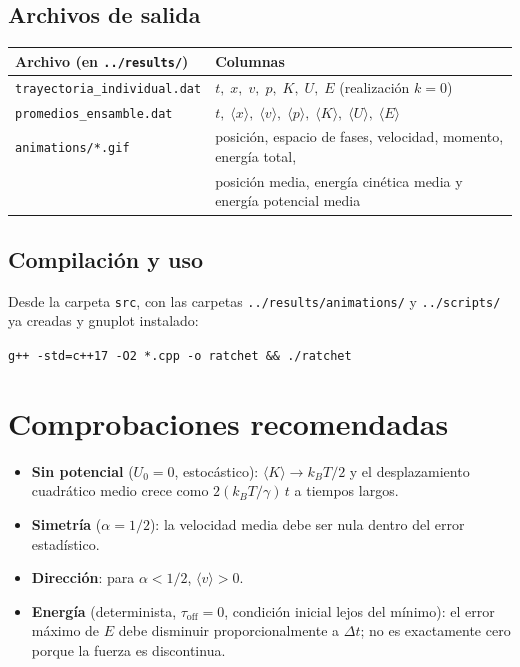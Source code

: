 \documentclass[11pt,a4paper]{article}
\begin{document}
\subsection{Archivos de salida}
\begin{center}
\begin{tabular}{@{}ll@{}}
\toprule
Archivo (en \texttt{../results/}) & Columnas \\
\midrule
\texttt{trayectoria\_individual.dat} & $t,\;x,\;v,\;p,\;K,\;U,\;E$ (realización $k=0$) \\
\texttt{promedios\_ensamble.dat} & $t,\;\langle x\rangle,\;\langle v\rangle,\;\langle p\rangle,\;\langle K\rangle,\;\langle U\rangle,\;\langle E\rangle$ \\
\texttt{animations/*.gif} & posición, espacio de fases, velocidad, momento, energía total, \\
 & posición media, energía cinética media y energía potencial media \\
\bottomrule
\end{tabular}
\end{center}

\subsection{Compilación y uso}
Desde la carpeta \texttt{src}, con las carpetas \texttt{../results/animations/} y \texttt{../scripts/} ya creadas y gnuplot instalado:
\begin{center}
\texttt{g++ -std=c++17 -O2 *.cpp -o ratchet \&\& ./ratchet}
\end{center}

\section{Comprobaciones recomendadas}
\begin{itemize}
\item \textbf{Sin potencial} ($U_0=0$, estocástico): $\langle K\rangle\to k_BT/2$ y el desplazamiento cuadrático medio crece como $2(k_BT/\gamma)\,t$ a tiempos largos.
\item \textbf{Simetría} ($\alpha=1/2$): la velocidad media debe ser nula dentro del error estadístico.
\item \textbf{Dirección}: para $\alpha<1/2$, $\langle v\rangle>0$.
\item \textbf{Energía} (determinista, $\tau_{\text{off}}=0$, condición inicial lejos del mínimo): el error máximo de $E$ debe disminuir proporcionalmente a $\Delta t$; no es exactamente cero porque la fuerza es discontinua.
\end{itemize}
\end{document}
